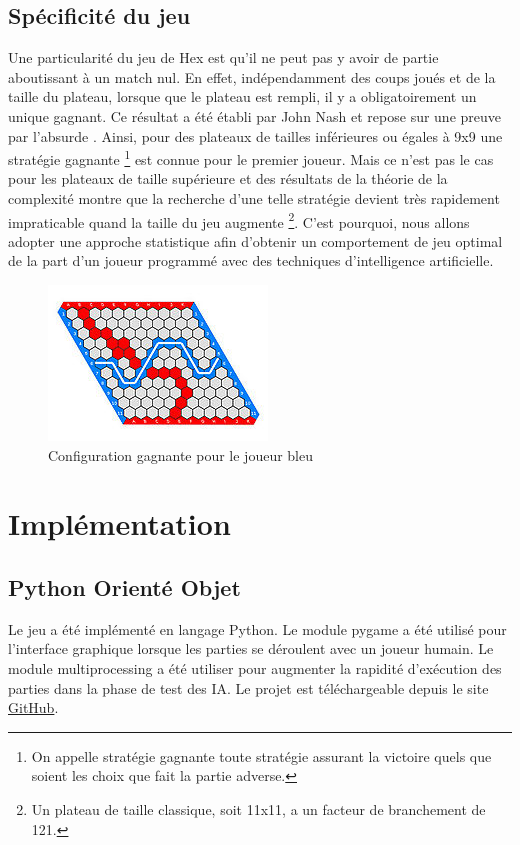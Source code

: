\documentclass[a4paper]{article}
\theoremstyle{definition}
\begin{document}
\subsection{Spécificité du jeu}

Une particularité du jeu de Hex est qu'il ne peut pas y avoir de partie aboutissant à un match nul. En effet, indépendamment des coups joués et de la taille du plateau, lorsque que le plateau est rempli, il y a obligatoirement un unique gagnant. Ce résultat a été établi par John Nash et repose sur une preuve par l'absurde \cite{preuvewiki}.
Ainsi, pour des plateaux de tailles inférieures ou égales à 9x9 une stratégie gagnante \footnote{On appelle stratégie gagnante toute stratégie assurant la victoire quels que soient les choix que fait la partie adverse.} est connue pour le premier joueur. Mais ce n'est pas le cas pour les plateaux de taille supérieure et des résultats de la théorie de la complexité montre que la recherche d'une telle stratégie devient très rapidement impraticable quand la taille du jeu augmente \footnote{Un plateau de taille classique, soit 11x11, a un facteur de branchement de 121.}. C'est pourquoi, nous allons adopter une approche statistique afin d'obtenir un comportement de jeu optimal de la part d'un joueur programmé avec des techniques d'intelligence artificielle.

\begin{figure}[h]
	\centering
	\includegraphics[scale=1]{11x11_gagnant.jpg}
	\caption{Configuration gagnante pour le joueur bleu}
\end{figure}

\section{Implémentation}

\subsection{Python Orienté Objet}

Le jeu a été implémenté en langage Python. Le module pygame a été utilisé pour l'interface graphique lorsque les parties se déroulent avec un joueur humain. Le module multiprocessing a été utiliser pour augmenter la rapidité d'exécution des parties dans la phase de test des IA. Le projet est téléchargeable depuis le site \href{https://github.com/Maxime-LP/Hex-Game}{GitHub}.\\
\end{document}
